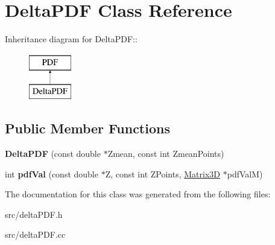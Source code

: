 \hypertarget{classDeltaPDF}{
\section{DeltaPDF Class Reference}
\label{dd/d98/classDeltaPDF}
}
Inheritance diagram for DeltaPDF::\begin{figure}[H]
\begin{center}
\leavevmode
\includegraphics[height=2cm]{dd/d98/classDeltaPDF}
\end{center}
\end{figure}
\subsection*{Public Member Functions}
\begin{DoxyCompactItemize}
\item 
\hypertarget{classDeltaPDF_a6268a222dac459788d7a7589e0bec1c5}{
{\bfseries DeltaPDF} (const double $\ast$Zmean, const int ZmeanPoints)}
\label{dd/d98/classDeltaPDF_a6268a222dac459788d7a7589e0bec1c5}

\item 
\hypertarget{classDeltaPDF_a787e205c3bd8d4f95f7c528497e3a617}{
int {\bfseries pdfVal} (const double $\ast$Z, const int ZPoints, \hyperlink{classMatrix3D}{Matrix3D} $\ast$pdfValM)}
\label{dd/d98/classDeltaPDF_a787e205c3bd8d4f95f7c528497e3a617}

\end{DoxyCompactItemize}


The documentation for this class was generated from the following files:\begin{DoxyCompactItemize}
\item 
src/deltaPDF.h\item 
src/deltaPDF.cc\end{DoxyCompactItemize}
